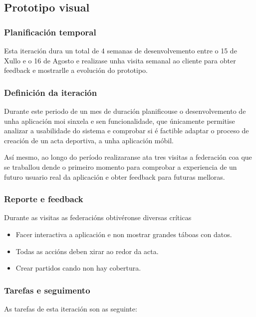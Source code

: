     \subsection{Prototipo visual}

      \subsubsection{Planificación temporal}
      Esta iteración dura un total de 4 semanas de desenvolvemento entre o 15 
de Xullo e o 16 de Agosto e realizase unha visita semanal ao cliente para obter 
feedback e mostrarlle a evolución do prototipo.

      \subsubsection{Definición da iteración}
      Durante este periodo de un mes de duración planificouse o desenvolvemento 
de unha aplicación moi sinxela e sen funcionalidade, que únicamente permitise 
analizar a usabilidade do sistema e comprobar si é factible adaptar o proceso 
de creación de un acta deportiva, a unha aplicación móbil.

    Así mesmo, ao longo do período realizaranse ata tres visitas a federación 
coa que se traballou dende o primeiro momento para comprobar a experiencia de 
un futuro usuario real da aplicación e obter feedback para futuras melloras.

      \subsubsection{Reporte e feedback}
      Durante as visitas as federacións obtivéronse diversas críticas 
      \begin{itemize}
        \item Facer interactiva a aplicación e non mostrar grandes táboas con 
datos.
        \item Todas as accións deben xirar ao redor da acta.
        \item Crear partidos cando non hay cobertura.
      \end{itemize}

      \subsubsection{Tarefas e seguimento}

      As tarefas de esta iteración son as seguinte:

